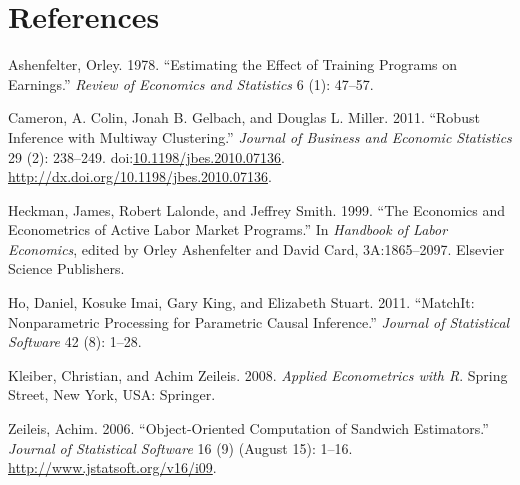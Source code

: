 \documentclass[]{article}
\begin{document}
\newpage

\section{References}\label{references}

Ashenfelter, Orley. 1978. ``Estimating the Effect of Training Programs
on Earnings.'' \emph{Review of Economics and Statistics} 6 (1): 47--57.

Cameron, A. Colin, Jonah B. Gelbach, and Douglas L. Miller. 2011.
``Robust Inference with Multiway Clustering.'' \emph{Journal of Business
and Economic Statistics} 29 (2): 238--249.
doi:\href{http://dx.doi.org/10.1198/jbes.2010.07136}{10.1198/jbes.2010.07136}.
\url{http://dx.doi.org/10.1198/jbes.2010.07136}.

Heckman, James, Robert Lalonde, and Jeffrey Smith. 1999. ``The Economics
and Econometrics of Active Labor Market Programs.'' In \emph{Handbook of
Labor Economics}, edited by Orley Ashenfelter and David Card,
3A:1865--2097. Elsevier Science Publishers.

Ho, Daniel, Kosuke Imai, Gary King, and Elizabeth Stuart. 2011.
``MatchIt: Nonparametric Processing for Parametric Causal Inference.''
\emph{Journal of Statistical Software} 42 (8): 1--28.

Kleiber, Christian, and Achim Zeileis. 2008. \emph{Applied Econometrics
with R}. Spring Street, New York, USA: Springer.

Zeileis, Achim. 2006. ``Object-Oriented Computation of Sandwich
Estimators.'' \emph{Journal of Statistical Software} 16 (9) (August 15):
1--16. \url{http://www.jstatsoft.org/v16/i09}.
\end{document}
